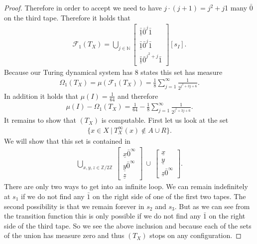 \documentclass[12pt,a4paper]{scrartcl}
\theoremstyle{plain}
\theoremstyle{definition}
\newcommand{\N}{\mathbb{N}} %
\newcommand{\2}{\mathbb{Z} / 2 \mathbb{Z}}
\newcommand{\1}{\bar{1}}
\newcommand{\0}{\bar{0}}
\begin{document}
\begin{proof}
	Therefore in order to accept we need to have $j \cdot (j + 1) = j^2 + j$1 many $\0$ on the third tape. Therefore it holds that
	\begin{align*}
		\mathcal{F}_1(T_X) = \bigcup_{j \in \N}\begin{bmatrix}
	 		\underline{\1} \0^j \1 \\
	 		\underline{\1} \0^j \1 \\
	 		\underline{\1} \0^{j^2 + j} \1
		\end{bmatrix}[s_I].
	\end{align*}
	Because our Turing dynamical system  has $8$ states this set has measure 
	\begin{align*}
		\Omega_1(T_X) = \mu(\mathcal{F}_1(T_X)) = \frac{1}{8} \sum_{j = 1}^{\infty} \frac{1}{2^{j^2 + 3j + 6}}.
	\end{align*}
	In addition it holds that $\mu (I) = \frac{1}{64}$ and therefore 
	\begin{align*}
		\mu (I) - \Omega_1(T_X) = \frac{1}{64} - \frac{1}{8} \sum_{j = 1}^{\infty} \frac{1}{2^{j^2 + 3j + 6}}.
	\end{align*}
	It remains to show that $(T_X)$ is computable.  First let us look at the set 
	\begin{align*}
		\{x \in X ~|~ T_X^\infty(x) \notin A \cup R\}.
	\end{align*}
	We will show that this set is contained in
	\begin{align*}
		\bigcup_{x,y,z \in \2} ~
		\begin{bmatrix}
			\underline{x} \0^\infty \\
			\underline{y} \0^\infty \\
			\underline{z}
		\end{bmatrix} \  \cup \
		\begin{bmatrix}
			\underline{x} \\
			\underline{y} \\
			\underline{z} \0^\infty
		\end{bmatrix}.
	\end{align*}
	There are only two ways to get into an infinite loop. We can remain indefinitely at $s_1$ if we do not find any $\1$ on the right side of one of the first two tapes. The second possibility is that we remain forever in $s_2$ and $s_3$. But as we can see from the transition function this is only possible if we do not find any $\1$ on the  right side of the third tape. So we see the above inclusion and because each of the sets of the union has measure zero and thus $(T_X)$ stops on any configuration. 


\end{proof}
\end{document}
